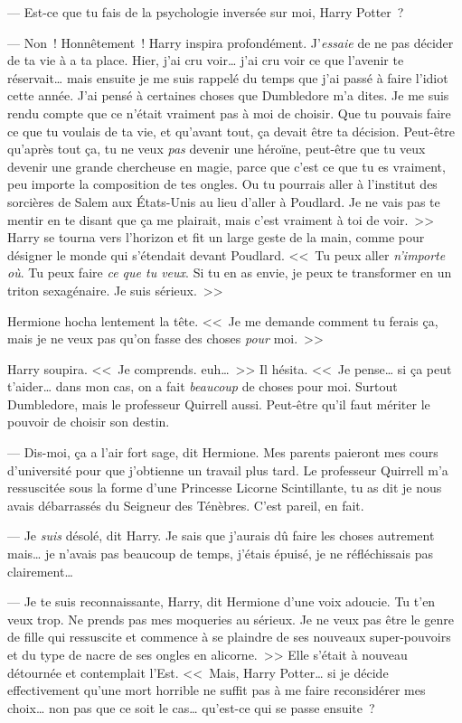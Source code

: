 --- Est-ce que tu fais de la psychologie inversée sur moi, Harry Potter~?

--- Non~! Honnêtement~! Harry inspira profondément. J'\emph{essaie} de ne pas décider de ta vie à a ta place. Hier, j'ai cru voir… j'ai cru voir ce que l'avenir te réservait… mais ensuite je me suis rappelé du temps que j'ai passé à faire l'idiot cette année. J'ai pensé à certaines choses que Dumbledore m'a dites. Je me suis rendu compte que ce n'était vraiment pas à moi de choisir. Que tu pouvais faire ce que tu voulais de ta vie, et qu'avant tout, ça devait être ta décision. Peut-être qu'après tout ça, tu ne veux \emph{pas} devenir une héroïne, peut-être que tu veux devenir une grande chercheuse en magie, parce que c'est ce que tu es vraiment, peu importe la composition de tes ongles. Ou tu pourrais aller à l'institut des sorcières de Salem aux États-Unis au lieu d'aller à Poudlard. Je ne vais pas te mentir en te disant que ça me plairait, mais c'est vraiment à toi de voir.~>> Harry se tourna vers l'horizon et fit un large geste de la main, comme pour désigner le monde qui s'étendait devant Poudlard. <<~Tu peux aller \emph{n'importe où}. Tu peux faire \emph{ce que tu veux}. Si tu en as envie, je peux te transformer en un triton sexagénaire. Je suis sérieux.~>>

Hermione hocha lentement la tête. <<~Je me demande comment tu ferais ça, mais je ne veux pas qu'on fasse des choses \emph{pour} moi.~>>

Harry soupira. <<~Je comprends. euh…~>> Il hésita. <<~Je pense… si ça peut t'aider… dans mon cas, on a fait \emph{beaucoup} de choses pour moi. Surtout Dumbledore, mais le professeur Quirrell aussi. Peut-être qu'il faut mériter le pouvoir de choisir son destin.

--- Dis-moi, ça a l'air fort sage, dit Hermione. Mes parents paieront mes cours d'université pour que j'obtienne un travail plus tard. Le professeur Quirrell m'a ressuscitée sous la forme d'une Princesse Licorne Scintillante, tu as dit je nous avais débarrassés du Seigneur des Ténèbres. C'est pareil, en fait.

--- Je \emph{suis} désolé, dit Harry. Je sais que j'aurais dû faire les choses autrement mais… je n'avais pas beaucoup de temps, j'étais épuisé, je ne réfléchissais pas clairement…

--- Je te suis reconnaissante, Harry, dit Hermione d'une voix adoucie. Tu t'en veux trop. Ne prends pas mes moqueries au sérieux. Je ne veux pas être le genre de fille qui ressuscite et commence à se plaindre de ses nouveaux super-pouvoirs et du type de nacre de ses ongles en alicorne.~>> Elle s'était à nouveau détournée et contemplait l'Est. <<~Mais, Harry Potter… si je décide effectivement qu'une mort horrible ne suffit pas à me faire reconsidérer mes choix… non pas que ce soit le cas… qu'est-ce qui se passe ensuite~?

